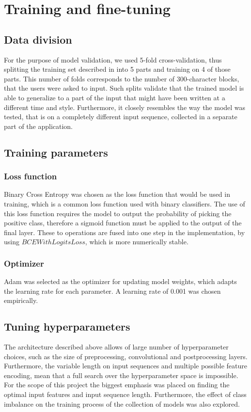 \section{Training and fine-tuning}

\subsection{Data division}
For the purpose of model validation, we used 5-fold cross-validation, thus splitting the training set described in  into 5 parts and training on 4 of those parts. This number of folds corresponds to the number of 300-character blocks, that the users were asked to input. Such splits validate that the trained model is able to generalize to a part of the input that might have been written at a different time and style. Furthermore, it closely resembles the way the model was tested, that is on a completely different input sequence, collected in a separate part of the application.  

\subsection{Training parameters}

\subsubsection{Loss function}
Binary Cross Entropy was chosen as the loss function that would be used in training, which is a common loss function used with binary classifiers. 
The use of this loss function requires the model to output the probability of picking the positive class, therefore a sigmoid function must be applied to the output of the final layer.
These to operations are fused into one step in the implementation, by using  $BCEWithLogitsLoss$, which is more numerically stable.

\subsubsection{Optimizer}
Adam was selected as the optimizer for updating model weights, which adapts the learning rate for each parameter. A learning rate of 0.001 was chosen empirically.

\subsection{Tuning hyperparameters}
The architecture described above allows of large number of hyperparameter choices, such as the size of preprocessing, convolutional and postprocessing layers. Furthermore, the variable length on input sequences and multiple possible feature encoding, mean that a full search over the hyperparameter space is impossible. For the scope of this project the biggest emphasis was placed on finding the optimal input features and input sequence length. Furthermore, the effect of class imbalance on the training process of the collection of models was also explored.
 

